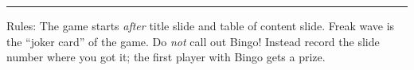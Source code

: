 \documentclass[a4paper]{article}
\begin{document}
\hrule
\vspace{2pt}
   \footnotesize{
     Rules: The game starts \emph{after} title slide and table of content
     slide. Freak wave is the ``joker card'' of the game. Do \emph{not} call
     out Bingo! Instead record the slide number where you got it; the first
     player with Bingo gets a prize.
    }
\end{document}
